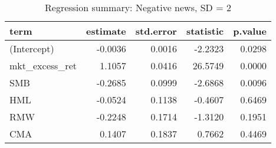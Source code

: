 \begin{table}[H]
\centering
\caption{Regression summary: Negative news, SD = 2}
\begin{tabular}{lrrrr}
  \hline
term & estimate & std.error & statistic & p.value \\ 
  \hline
(Intercept) & -0.0036 & 0.0016 & -2.2323 & 0.0298 \\ 
  mkt\_excess\_ret & 1.1057 & 0.0416 & 26.5749 & 0.0000 \\ 
  SMB & -0.2685 & 0.0999 & -2.6868 & 0.0096 \\ 
  HML & -0.0524 & 0.1138 & -0.4607 & 0.6469 \\ 
  RMW & -0.2248 & 0.1714 & -1.3120 & 0.1951 \\ 
  CMA & 0.1407 & 0.1837 & 0.7662 & 0.4469 \\ 
   \hline
\end{tabular}
\label{tab: summary_neg_2}
\end{table}


